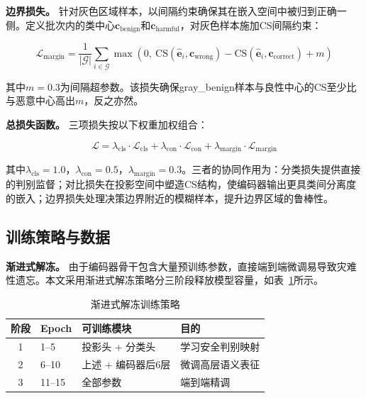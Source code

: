 \textbf{边界损失。} 针对灰色区域样本，以间隔约束确保其在嵌入空间中被归到正确一侧。定义批次内的类中心$\mathbf{c}_{\text{benign}}$和$\mathbf{c}_{\text{harmful}}$，对灰色样本施加CS间隔约束：

\begin{equation}
\mathcal{L}_{\text{margin}} = \frac{1}{|\mathcal{G}|} \sum_{i \in \mathcal{G}} \max\left(0,\ \text{CS}(\hat{\mathbf{e}}_i, \mathbf{c}_{\text{wrong}}) - \text{CS}(\hat{\mathbf{e}}_i, \mathbf{c}_{\text{correct}}) + m\right)
\label{eq:margin_loss}
\end{equation}

\noindent 其中$m = 0.3$为间隔超参数。该损失确保gray\_benign样本与良性中心的CS至少比与恶意中心高出$m$，反之亦然。

\textbf{总损失函数。} 三项损失按以下权重加权组合：

\begin{equation}
\mathcal{L} = \lambda_{\text{cls}} \cdot \mathcal{L}_{\text{cls}} + \lambda_{\text{con}} \cdot \mathcal{L}_{\text{con}} + \lambda_{\text{margin}} \cdot \mathcal{L}_{\text{margin}}
\label{eq:total_loss}
\end{equation}

\noindent 其中$\lambda_{\text{cls}} = 1.0$，$\lambda_{\text{con}} = 0.5$，$\lambda_{\text{margin}} = 0.3$。三者的协同作用为：分类损失提供直接的判别监督；对比损失在投影空间中塑造CS结构，使编码器输出更具类间分离度的嵌入；边界损失处理决策边界附近的模糊样本，提升边界区域的鲁棒性。


\subsection{训练策略与数据}

\textbf{渐进式解冻。} 由于编码器骨干包含大量预训练参数，直接端到端微调易导致灾难性遗忘。本文采用渐进式解冻策略分三阶段释放模型容量，如表~\ref{tab:unfreezing}所示。

\begin{table}[t]
\centering
\caption{渐进式解冻训练策略}
\label{tab:unfreezing}
\begin{tabular}{clll}
\toprule
\textbf{阶段} & \textbf{Epoch} & \textbf{可训练模块} & \textbf{目的} \\
\midrule
1 & 1--5 & 投影头 + 分类头 & 学习安全判别映射 \\
2 & 6--10 & 上述 + 编码器后6层 & 微调高层语义表征 \\
3 & 11--15 & 全部参数 & 端到端精调 \\
\bottomrule
\end{tabular}
\end{table}

